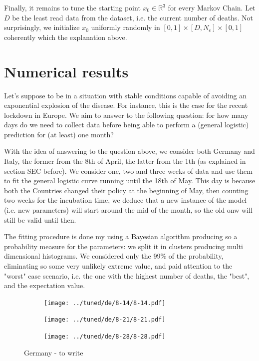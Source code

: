 \documentclass[8pt]{article}
\begin{document}
Finally, it remains to tune the starting point $x_0 \in \mathbb{R}^3$
for every Markov Chain. Let $D$ be
the least read data from the dataset, i.e. the current
number of deaths.
Not surprisingly, we initialize $x_0$ uniformly randomly in
$[0, 1] \times [D, N_e] \times [0,1]$ coherently which the explanation above.


\section{Numerical results}
Let's suppose to be in
a situation with stable conditions capable of avoiding an exponential
explosion of the disease. For instance, this is the case for the recent
lockdown in Europe.
We aim to answer to the following question:
for how many days do we need to collect data before being able 
to perform a (general logistic) prediction for (at least) one month?


With the idea of answering to the question above, we consider both Germany
and Italy, the former from the 8th of April, the latter from the 1th
(as explained in section SEC before). We consider one, two and three weeks
of data and use them to fit the general logistic curve running until the
18th of May. This day is because both the Countries
changed their policy at the beginning of May, then counting 
two weeks for the incubation time, we deduce that 
a new instance of the model (i.e. new parameters)
will start around the mid of the month, so the old onw will still be valid
until then.


The fitting procedure is done my using a Bayesian algorithm
producing so a probability measure for the parameters: we split it in
clusters producing multi dimensional histograms. We considered
only the 99\% of the probability, eliminating so some very
unlikely extreme value, and paid attention to
the "worst" case scenario, i.e. the one with the highest number of deaths, 
the "best", and the expectation value.


\begin{figure}[h!]
  \centering
  \begin{subfigure}[b]{0.45\linewidth}
  \texttt{[image: ../tuned/de/8-14/8-14.pdf]}
  \end{subfigure}
  \begin{subfigure}[b]{0.45\linewidth}
    \texttt{[image: ../tuned/de/8-21/8-21.pdf]}
  \end{subfigure}
  \begin{subfigure}[b]{0.45\linewidth}
  \texttt{[image: ../tuned/de/8-28/8-28.pdf]}
  \end{subfigure}
	\caption{Germany - to write}
\end{figure}
\end{document}
